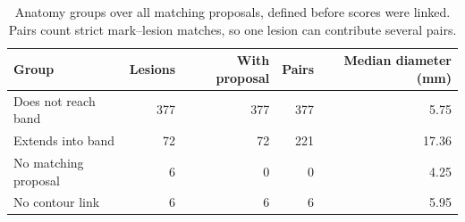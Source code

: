 \begin{table}[!t]
\centering
\small
\caption{Anatomy groups over all matching proposals, defined before scores were linked. Pairs count strict mark--lesion matches, so one lesion can contribute several pairs.}
\label{tab:anatomy_counts}
\begin{tabular}{@{}lrrrr@{}}
\toprule
Group & Lesions & With proposal & Pairs & Median diameter (mm) \\
\midrule
Does not reach band & 377 & 377 & 377 & 5.75 \\
Extends into band & 72 & 72 & 221 & 17.36 \\
No matching proposal & 6 & 0 & 0 & 4.25 \\
No contour link & 6 & 6 & 6 & 5.95 \\
\bottomrule
\end{tabular}
\end{table}
